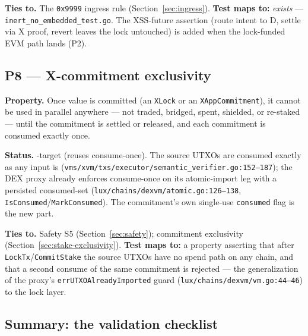\textbf{Ties to.} The \texttt{0x9999} ingress rule
(Section~\ref{sec:ingress}). \textbf{Test maps to:} \emph{exists} ---
\texttt{inert\_no\_embedded\_test.go}. The XSS-future assertion (route
intent to D, settle via X proof, revert leaves the lock untouched) is
added when the lock-funded EVM path lands (P2).

\subsection*{P8 --- X-commitment exclusivity}

\textbf{Property.} Once value is committed (an \texttt{XLock} or an
\texttt{XAppCommitment}), it cannot be used in parallel anywhere ---
not traded, bridged, spent, shielded, or re-staked --- until the
commitment is settled or released, and each commitment is consumed
exactly once.

\textbf{Status.} \DESIGN{}-target (reuses \IMPL{} consume-once). The
source UTXOs are consumed exactly as any input is
(\texttt{vms/xvm/txs/executor/\allowbreak semantic\_verifier.go:152--187});
the DEX proxy already enforces consume-once on its atomic-import leg with a
persisted consumed-set (\texttt{lux/chains/dexvm/atomic.go:126--138},
\texttt{IsConsumed}/\texttt{MarkConsumed}). The commitment's own
single-use \texttt{consumed} flag is the new part.

\textbf{Ties to.} Safety S5 (Section~\ref{sec:safety}); commitment
exclusivity (Section~\ref{sec:stake-exclusivity}). \textbf{Test maps
to:} a property asserting that after \texttt{LockTx}/\texttt{CommitStake}
the source UTXOs have no spend path on any chain, and that a second
consume of the same commitment is rejected --- the generalization of the
proxy's \texttt{errUTXOAlreadyImported} guard
(\texttt{lux/chains/dexvm/vm.go:44--46}) to the lock layer.

\subsection{Summary: the validation checklist}

